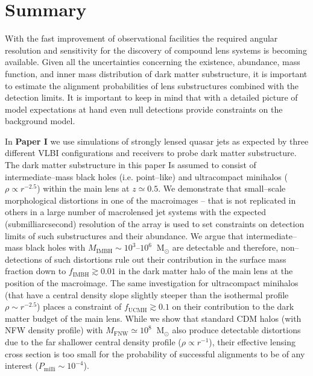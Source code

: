 \documentclass[a4wide,12pt]{book}
\begin{document}
\chapter{Summary}
With the fast improvement of observational facilities the required angular resolution and sensitivity for the discovery of compound lens systems is becoming available. Given all the uncertainties concerning the existence, abundance, mass function, and inner mass distribution of dark matter substructure, it is important to estimate the alignment probabilities of lens substructures combined with the detection limits. It is important to keep in mind that with a detailed picture of model expectations at hand even null detections provide constraints on the background model.

In {\bf Paper I} we use simulations of strongly lensed quasar jets as expected by three different VLBI configurations and receivers to probe dark matter substructure. The dark matter substructure in this paper Is assumed to consist of intermediate--mass black holes (i.e. point--like) and ultracompact minihalos ($\rho \propto r^{-2.5}$) within the main lens at $z \simeq 0.5$. We demonstrate that small--scale morphological distortions in one of the macroimages -- that is not replicated in others in a large number of macrolensed jet systems with the expected (submilliarcsecond) resolution of the array is used to set constraints on detection limits of such substructures and their abundance. We argue that intermediate--mass black holes with $M_\mathrm{IMBH} \sim 10^3$--$10^6\ $ $\mathrm{M}_{\odot} $  are detectable and therefore, non--detections of such distortions rule out their contribution in the surface mass fraction down to $f_\mathrm{IMBH}\gtrsim 0.01$ in the dark matter halo of the main lens at the position of the macroimage. The same investigation for ultracompact minihalos (that have a central density slope slightly steeper than the isothermal profile $\rho\sim r^{-2.5}$) places a constraint of $f_\mathrm{UCMH}\gtrsim 0.1$ on their contribution to the dark matter budget of the main lens. While we show that standard CDM halos (with NFW density profile) with $M_\mathrm{FNW} \simeq 10^8\ $ $\mathrm{M}_{\odot} $ also produce detectable distortions due to the far shallower central density profile ($\rho \propto r^{-1}$), their effective lensing cross section is too small for the probability of successful alignments to be of any interest ($P_\mathrm{milli}\sim 10^{-4}$).
\end{document}

